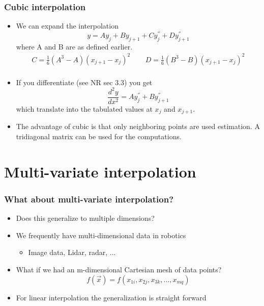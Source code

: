 \documentclass[10pt]{beamer}
\begin{document}
\begin{frame}
  \frametitle{Cubic interpolation}
  \begin{itemize}
  \item We can expand the interpolation
    \[
      y = A y_j + B y_{j+1} + C y^{''}_j + D y^{''}_{j+1}
    \]
    where A and B are as defined earlier.
    \[
      \begin{array}{cc}
        C = \frac{1}{6} (A^3-A)(x_{j+1} - x_j)^2 ~~~ & ~~~
        D = \frac{1}{6} (B^3-B)(x_{j+1} - x_j)^2\\                                                       
      \end{array}
    \]
  \item If you differentiate (see NR sec 3.3) you get
    \[
      \frac{d^2y}{dx^2} = A y^{''}_j + B y^{''}_{j+1}
    \]
    which translate into the tabulated values at $x_j$ and $x_{j+1}$.
  \item The advantage of cubic is that only neighboring points are
    used estimation. A tridiagonal matrix can be used for the
    computations. 
  \end{itemize}
\end{frame}

\section{Multi-variate interpolation}

\begin{frame}
  \frametitle{What about multi-variate interpolation? }
  \begin{itemize}
  \item Does this generalize to multiple dimensions? 
  \item We frequently have multi-dimensional data in robotics
    \begin{itemize}
    \item Image data, Lidar, radar, ...
    \end{itemize}
  \item What if we had an m-dimensional Cartesian mesh of data points?
    \[
      f(\vec{x}) = f(x_{1i}, x_{2j}, x_{3k}, \ldots, x_{mq})
    \]
  \item For linear interpolation the generalization is straight forward
  \end{itemize}
\end{frame}
\end{document}
